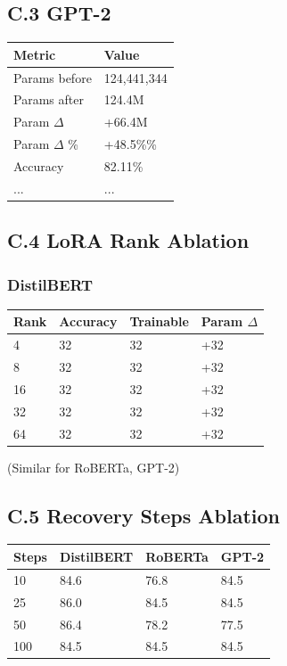 \subsection{C.3 GPT-2}

\begin{table}[H]
\centering
\small
\begin{tabular}{ll}
\toprule
\textbf{Metric} & \textbf{Value} \\
\midrule
Params before & 124,441,344 \\
Params after & 124.4M \\
Param $\Delta$ & +66.4M \\
Param $\Delta$ \% & +48.5\%\% \\
Accuracy & 82.11\% \\
... & ... \\
\bottomrule
\end{tabular}
\end{table}

\subsection{C.4 LoRA Rank Ablation}

\subsubsection{DistilBERT}

\begin{table}[H]
\centering
\small
\begin{tabular}{llll}
\toprule
\textbf{Rank} & \textbf{Accuracy} & \textbf{Trainable} & \textbf{Param $\Delta$} \\
\midrule
4 & 32 & 32 & +32 \\
8 & 32 & 32 & +32 \\
16 & 32 & 32 & +32 \\
32 & 32 & 32 & +32 \\
64 & 32 & 32 & +32 \\
\bottomrule
\end{tabular}
\end{table}

(Similar for RoBERTa, GPT-2)

\subsection{C.5 Recovery Steps Ablation}

\begin{table}[H]
\centering
\small
\begin{tabular}{llll}
\toprule
\textbf{Steps} & \textbf{DistilBERT} & \textbf{RoBERTa} & \textbf{GPT-2} \\
\midrule
10 & 84.6 & 76.8 & 84.5 \\
25 & 86.0 & 84.5 & 84.5 \\
50 & 86.4 & 78.2 & 77.5 \\
100 & 84.5 & 84.5 & 84.5 \\
\bottomrule
\end{tabular}
\end{table}

